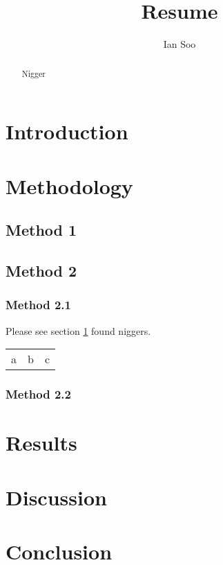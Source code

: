 \documentclass{article}
\author{Ian Soo}
\title{Resume}
\begin{document}
\maketitle
\begin{abstract}
    Nigger
\end{abstract}

\section{Introduction}\label{sec:intro}

\section{Methodology}

\subsection{Method 1}

\subsection{Method 2}

\subsubsection{Method 2.1}
Please see section \ref{sec:intro}
\cite{Nigger} found niggers.

\begin{tabular}{lll}
    a & b & c
\end{tabular}

\subsubsection{Method 2.2}

\section{Results}

\section{Discussion}

\section{Conclusion}



\end{document}
